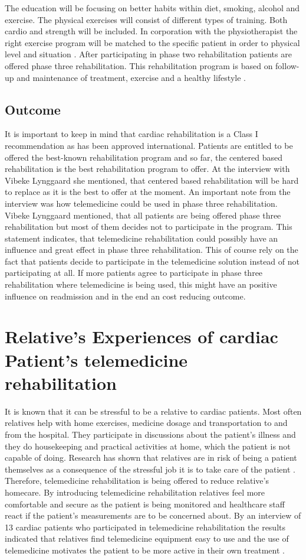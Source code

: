 The education will be focusing on better habits within diet, smoking, alcohol and exercise. The physical exercises will consist of different types of training. Both cardio and strength will be included. In corporation with the physiotherapist the right exercise program will be matched to the specific patient in order to physical level and situation \cite{herning}. After participating in phase two rehabilitation patients are offered phase three rehabilitation. This rehabilitation program is based on follow-up and maintenance of treatment, exercise and a healthy lifestyle \cite{Rehabilitering}.

\subsection{Outcome}  
It is important to keep in mind that cardiac rehabilitation is a Class I recommendation as has been approved international. Patients are entitled to be offered the best-known rehabilitation program and so far, the centered based rehabilitation is the best rehabilitation program to offer. At the interview with Vibeke Lynggaard she mentioned, that centered based rehabilitation will be hard to replace as it is the best to offer at the moment. An important note from the interview was how telemedicine could be used in phase three rehabilitation. Vibeke Lynggaard mentioned, that all patients are being offered phase three rehabilitation but most of them decides not to participate in the program. This statement indicates, that telemedicine rehabilitation could possibly have an influence and great effect in phase three rehabilitation. This of course rely on the fact that patients decide to participate in the telemedicine solution instead of not participating at all. If more patients agree to participate in phase three rehabilitation where telemedicine is being used, this might have an positive influence on readmission and in the end an cost reducing outcome.  


\section{Relative’s Experiences of cardiac Patient’s telemedicine rehabilitation}
It is known that it can be stressful to be a relative to cardiac patients. Most often relatives help with home exercises, medicine dosage and transportation to and from the hospital. They participate in discussions about the patient’s illness and they do housekeeping and practical activities at home, which the patient is not capable of doing. Research has shown that relatives are in risk of being a patient themselves as a consequence of the stressful job it is to take care of the patient \cite{4, 5}. Therefore, telemedicine rehabilitation is being offered to reduce relative’s homecare. By introducing telemedicine rehabilitation relatives feel more comfortable and secure as the patient is being monitored and healthcare staff react if the patient’s measurements are to be concerned about. By an interview of 13 cardiac patients who participated in telemedicine rehabilitation the results indicated that relatives find telemedicine equipment easy to use and the use of telemedicine motivates the patient to be more active in their own treatment \cite{12}.  

